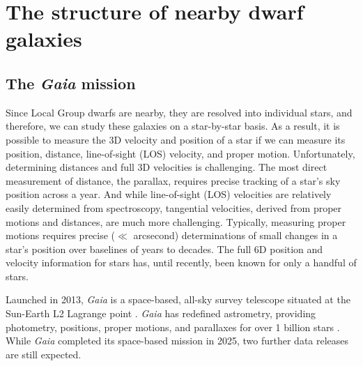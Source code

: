 \section{The structure of nearby dwarf
galaxies}\label{the-structure-of-nearby-dwarf-galaxies}

\subsection{\texorpdfstring{The \emph{Gaia}
mission}{The Gaia mission}}\label{the-gaia-mission}

Since Local Group dwarfs are nearby, they are resolved into individual
stars, and therefore, we can study these galaxies on a star-by-star
basis. As a result, it is possible to measure the 3D velocity and
position of a star if we can measure its position, distance,
line-of-sight (LOS) velocity, and proper motion. Unfortunately,
determining distances and full 3D velocities is challenging. The most
direct measurement of distance, the parallax, requires precise tracking
of a star's sky position across a year. And while line-of-sight (LOS)
velocities are relatively easily determined from spectroscopy,
tangential velocities, derived from proper motions and distances, are
much more challenging. Typically, measuring proper motions requires
precise (\(\ll\) arcsecond) determinations of small changes in a star's
position over baselines of years to decades. The full 6D position and
velocity information for stars has, until recently, been known for only
a handful of stars.

Launched in 2013, \emph{Gaia} is a space-based, all-sky survey telescope
situated at the Sun-Earth L2 Lagrange point
\citep{gaiacollaboration+2016}. \emph{Gaia} has redefined astrometry,
providing photometry, positions, proper motions, and parallaxes for over
1 billion stars \citep{gaiacollaboration+2021}. While \emph{Gaia}
completed its space-based mission in 2025, two further data releases are
still expected.

